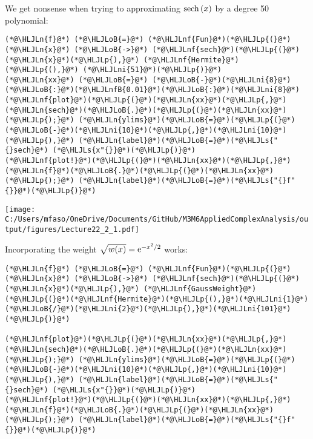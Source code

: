 \documentclass[12pt,landscape]{article}
\newcommand{\HLJLn}[1]{#1}
\newcommand{\HLJLnf}[1]{\textcolor[RGB]{66,102,213}{#1}}
\newcommand{\HLJLs}[1]{\textcolor[RGB]{201,61,57}{#1}}
\newcommand{\HLJLnfB}[1]{\textcolor[RGB]{59,151,46}{#1}}
\newcommand{\HLJLni}[1]{\textcolor[RGB]{59,151,46}{#1}}
\newcommand{\HLJLoB}[1]{\textcolor[RGB]{102,102,102}{\textbf{#1}}}
\newcommand{\HLJLp}[1]{#1}
\def\E{ {\rm e} }
\def\sech{ {\rm sech}\, }
\begin{document}
{We get nonsense when trying to approximating $\sech(x)$ by a degree 50 polynomial:


\begin{lstlisting}
(*@\HLJLn{f}@*) (*@\HLJLoB{=}@*) (*@\HLJLnf{Fun}@*)(*@\HLJLp{(}@*)(*@\HLJLn{x}@*) (*@\HLJLoB{->}@*) (*@\HLJLnf{sech}@*)(*@\HLJLp{(}@*)(*@\HLJLn{x}@*)(*@\HLJLp{),}@*) (*@\HLJLnf{Hermite}@*)(*@\HLJLp{(),}@*) (*@\HLJLni{51}@*)(*@\HLJLp{)}@*)
(*@\HLJLn{xx}@*) (*@\HLJLoB{=}@*) (*@\HLJLoB{-}@*)(*@\HLJLni{8}@*)(*@\HLJLoB{:}@*)(*@\HLJLnfB{0.01}@*)(*@\HLJLoB{:}@*)(*@\HLJLni{8}@*)
(*@\HLJLnf{plot}@*)(*@\HLJLp{(}@*)(*@\HLJLn{xx}@*)(*@\HLJLp{,}@*) (*@\HLJLn{sech}@*)(*@\HLJLoB{.}@*)(*@\HLJLp{(}@*)(*@\HLJLn{xx}@*)(*@\HLJLp{);}@*) (*@\HLJLn{ylims}@*)(*@\HLJLoB{=}@*)(*@\HLJLp{(}@*)(*@\HLJLoB{-}@*)(*@\HLJLni{10}@*)(*@\HLJLp{,}@*)(*@\HLJLni{10}@*)(*@\HLJLp{),}@*) (*@\HLJLn{label}@*)(*@\HLJLoB{=}@*)(*@\HLJLs{"{}sech}@*) (*@\HLJLs{x"{}}@*)(*@\HLJLp{)}@*)
(*@\HLJLnf{plot!}@*)(*@\HLJLp{(}@*)(*@\HLJLn{xx}@*)(*@\HLJLp{,}@*) (*@\HLJLn{f}@*)(*@\HLJLoB{.}@*)(*@\HLJLp{(}@*)(*@\HLJLn{xx}@*)(*@\HLJLp{);}@*) (*@\HLJLn{label}@*)(*@\HLJLoB{=}@*)(*@\HLJLs{"{}f"{}}@*)(*@\HLJLp{)}@*)
\end{lstlisting}

\texttt{[image: C:/Users/mfaso/OneDrive/Documents/GitHub/M3M6AppliedComplexAnalysis/output/figures/Lecture22\_2\_1.pdf]}

Incorporating the weight $\sqrt{w(x)} = \E^{-x^2/2}$ works:


\begin{lstlisting}
(*@\HLJLn{f}@*) (*@\HLJLoB{=}@*) (*@\HLJLnf{Fun}@*)(*@\HLJLp{(}@*)(*@\HLJLn{x}@*) (*@\HLJLoB{->}@*) (*@\HLJLnf{sech}@*)(*@\HLJLp{(}@*)(*@\HLJLn{x}@*)(*@\HLJLp{),}@*) (*@\HLJLnf{GaussWeight}@*)(*@\HLJLp{(}@*)(*@\HLJLnf{Hermite}@*)(*@\HLJLp{(),}@*)(*@\HLJLni{1}@*)(*@\HLJLoB{/}@*)(*@\HLJLni{2}@*)(*@\HLJLp{),}@*)(*@\HLJLni{101}@*)(*@\HLJLp{)}@*)

(*@\HLJLnf{plot}@*)(*@\HLJLp{(}@*)(*@\HLJLn{xx}@*)(*@\HLJLp{,}@*) (*@\HLJLn{sech}@*)(*@\HLJLoB{.}@*)(*@\HLJLp{(}@*)(*@\HLJLn{xx}@*)(*@\HLJLp{);}@*) (*@\HLJLn{ylims}@*)(*@\HLJLoB{=}@*)(*@\HLJLp{(}@*)(*@\HLJLoB{-}@*)(*@\HLJLni{10}@*)(*@\HLJLp{,}@*)(*@\HLJLni{10}@*)(*@\HLJLp{),}@*) (*@\HLJLn{label}@*)(*@\HLJLoB{=}@*)(*@\HLJLs{"{}sech}@*) (*@\HLJLs{x"{}}@*)(*@\HLJLp{)}@*)
(*@\HLJLnf{plot!}@*)(*@\HLJLp{(}@*)(*@\HLJLn{xx}@*)(*@\HLJLp{,}@*) (*@\HLJLn{f}@*)(*@\HLJLoB{.}@*)(*@\HLJLp{(}@*)(*@\HLJLn{xx}@*)(*@\HLJLp{);}@*) (*@\HLJLn{label}@*)(*@\HLJLoB{=}@*)(*@\HLJLs{"{}f"{}}@*)(*@\HLJLp{)}@*)
\end{lstlisting}

}
\end{document}
